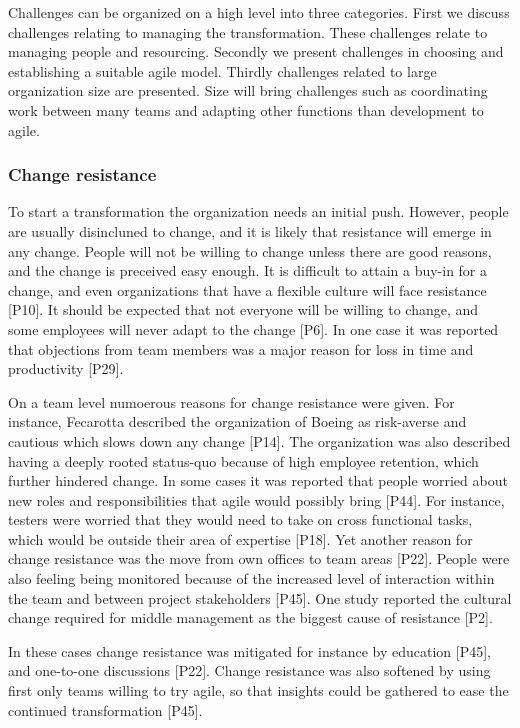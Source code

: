 \documentclass[preprint,authoryear,12pt]{elsarticle}
\begin{document}
Challenges can be organized on a high level into three categories. First we
discuss challenges relating to managing the transformation. These challenges
relate to managing people and resourcing. Secondly we present challenges in
choosing and establishing a suitable agile model. Thirdly challenges related to
large organization size are presented. Size will bring challenges such as
coordinating work between many teams and adapting other functions than
development to agile.



\subsubsection{Change resistance}

To start a transformation the organization needs an initial push. However,
people are usually disincluned to change, and it is likely that resistance
will emerge in any change. 
People will not be willing to change unless there are good reasons, and the
change is preceived easy enough. It is difficult to attain a buy-in for a
change, and even organizations that have a flexible culture will face resistance
[P10]. It should be expected that not everyone will be willing to change, and
some employees will never adapt to the change [P6]. In one case it was reported
that objections from team members was a major reason for loss in time and
productivity [P29].

On a team level numoerous reasons for change resistance were given. For
instance, Fecarotta described the organization of Boeing as risk-averse and
cautious which slows down any change [P14]. The organization was also described
having a deeply rooted status-quo because of high employee retention, which
further hindered change. In some cases it was reported that people worried about
new roles and responsibilities that agile would possibly bring [P44]. For
instance, testers were worried that they would need to take on cross functional
tasks, which would be outside their area of expertise [P18]. Yet another reason
for change resistance was the move from own offices to team areas [P22]. People
were also feeling being monitored because of the increased level of interaction
within the team and between project stakeholders [P45]. One study reported the
cultural change required for middle management as the biggest cause of
resistance [P2].

In these cases change resistance was mitigated for instance by education [P45],
and one-to-one discussions [P22]. Change resistance was also softened by using
first only teams willing to try agile, so that insights could be gathered to
ease the continued transformation [P45].
\end{document}
